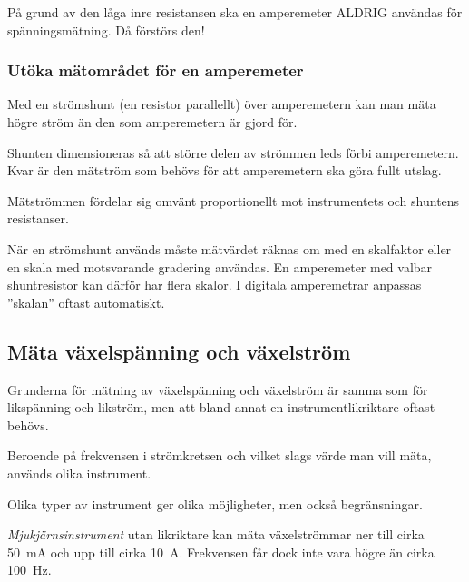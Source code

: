 \begin{center}
\begin{minipage}{0.19\columnwidth}
\Huge{\selectfont{}\relax}
\end{minipage}
\begin{minipage}{0.7\columnwidth}
På grund av den låga inre resistansen ska en amperemeter
ALDRIG användas för spänningsmätning. Då förstörs den!
\end{minipage}
\end{center}

\subsubsection{Utöka mätområdet för en amperemeter}

Med en strömshunt (en resistor parallellt) över amperemetern kan man
mäta högre ström än den som amperemetern är gjord för.

Shunten dimensioneras så att större delen av strömmen leds förbi amperemetern.
Kvar är den mätström som behövs för att amperemetern ska göra fullt utslag.

Mätströmmen fördelar sig omvänt proportionellt mot instrumentets och
shuntens resistanser.

När en strömshunt används måste mätvärdet räknas om med en skalfaktor
eller en skala med motsvarande gradering användas.
En amperemeter med valbar shuntresistor kan därför har flera skalor.
I digitala amperemetrar anpassas ''skalan'' oftast automatiskt.

\newpage %
\subsection{Mäta växelspänning och växelström}

Grunderna för mätning av växelspänning och växelström är samma som för
likspänning och likström, men att bland annat en instrumentlikriktare oftast
behövs.

Beroende på frekvensen i strömkretsen och vilket slags värde man vill
mäta, används olika instrument.

Olika typer av instrument ger olika möjligheter, men också begränsningar.

\emph{Mjukjärnsinstrument} utan likriktare kan mäta växelströmmar ner
till cirka \SI{50}{\milli\ampere} och upp till cirka \SI{10}{\ampere}.
Frekvensen får dock inte vara högre än cirka \SI{100}{\hertz}.

